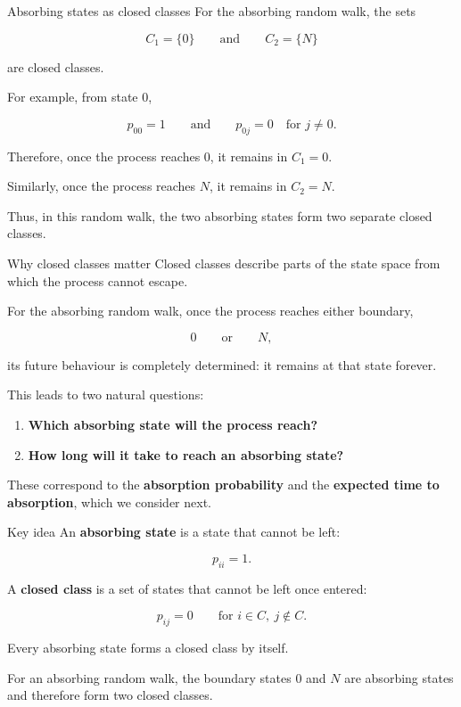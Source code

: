 \documentclass[
  ignorenonframetext,
  aspectratio=169,
]{beamer}
\providecommand{\tightlist}{%
  \setlength{\itemsep}{0pt}\setlength{\parskip}{0pt}}
\begin{document}
\begin{frame}{Absorbing states as closed classes}
\protect{}\label{absorbing-states-as-closed-classes}
For the absorbing random walk, the sets

\[
C_1=\{0\}
\qquad\text{and}\qquad
C_2=\{N\}
\]

are closed classes.

For example, from state \(0\),

\[
p_{00}=1
\qquad\text{and}\qquad
p_{0j}=0
\quad\text{for }j\ne0.
\]

Therefore, once the process reaches \(0\), it remains in \(C_1={0}\).

Similarly, once the process reaches \(N\), it remains in \(C_2={N}\).

Thus, in this random walk, the two absorbing states form two separate
closed classes.
\end{frame}

\begin{frame}{Why closed classes matter}
\protect{}\label{why-closed-classes-matter}
Closed classes describe parts of the state space from which the process
cannot escape.

For the absorbing random walk, once the process reaches either boundary,

\[
0
\qquad\text{or}\qquad
N,
\]

its future behaviour is completely determined: it remains at that state
forever.

This leads to two natural questions:

\begin{enumerate}
\tightlist
\item
  \textbf{Which absorbing state will the process reach?}
\item
  \textbf{How long will it take to reach an absorbing state?}
\end{enumerate}

These correspond to the \textbf{absorption probability} and the
\textbf{expected time to absorption}, which we consider next.
\end{frame}

\begin{frame}{Key idea}
\protect{}\label{key-idea}
An \textbf{absorbing state} is a state that cannot be left:

\[
p_{ii}=1.
\]

A \textbf{closed class} is a set of states that cannot be left once
entered:

\[
p_{ij}=0
\qquad
\text{for }i\in C,\ j\notin C.
\]

Every absorbing state forms a closed class by itself.

For an absorbing random walk, the boundary states \(0\) and \(N\) are
absorbing states and therefore form two closed classes.
\end{frame}
\end{document}
